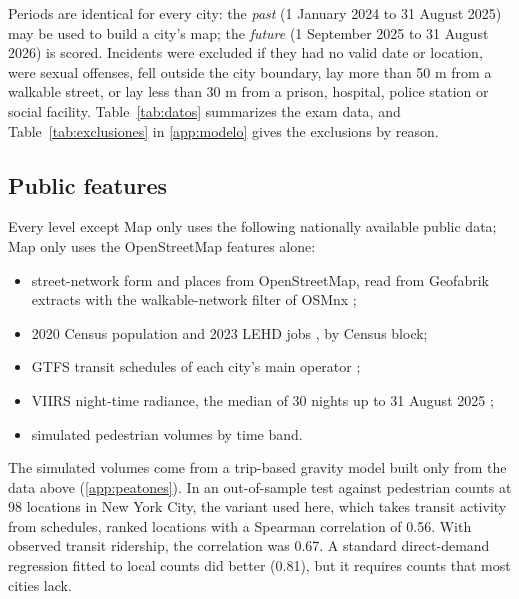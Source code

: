\documentclass[preprint,12pt,authoryear]{elsarticle}
\newcommand{\ajustar}[1]{\adjustbox{max width=\textwidth}{#1}}
\begin{document}
Periods are identical for every city: the \emph{past} (1 January 2024 to 31 August 2025) may be used to build a city's map; the \emph{future} (1 September 2025 to 31 August 2026) is scored. Incidents were excluded if they had no valid date or location, were sexual offenses, fell outside the city boundary, lay more than 50 m from a walkable street, or lay less than 30 m from a prison, hospital, police station or social facility. Table~\ref{tab:datos} summarizes the exam data, and Table~\ref{tab:exclusiones} in \ref{app:modelo} gives the exclusions by reason.

\begin{table}[htbp]
\centering\small
\caption{Exam data. ``Core incidents kept'' are violent crimes (09A, 120, 13A) in both periods after exclusions. Months covered: share of the 32 study months with at least one record.}
\label{tab:datos}
\ajustar{}
\end{table}

\subsection{Public features}
Every level except Map only uses the following nationally available public data; Map only uses the OpenStreetMap features alone:
\begin{itemize}
  \item street-network form and places from OpenStreetMap, read from Geofabrik extracts \citep{osm_geofabrik} with the walkable-network filter of OSMnx \citep{boeing2017osmnx};
  \item 2020 Census population \citep{census2020blocks} and 2023 LEHD jobs \citep{lodes8}, by Census block;
  \item GTFS transit schedules of each city's main operator \citep{mobilitydatabase};
  \item VIIRS night-time radiance, the median of 30 nights up to 31 August 2025 \citep{nasa_gibs_viirs};
  \item simulated pedestrian volumes by time band.
\end{itemize}
The simulated volumes come from a trip-based gravity model built only from the data above (\ref{app:peatones}). In an out-of-sample test against pedestrian counts at 98 locations in New York City, the variant used here, which takes transit activity from schedules, ranked locations with a Spearman correlation of 0.56. With observed transit ridership, the correlation was 0.67. A standard direct-demand regression fitted to local counts did better (0.81), but it requires counts that most cities lack.
\end{document}
